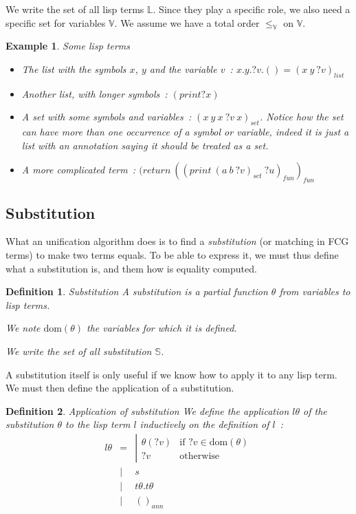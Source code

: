 \documentclass[]{article}
\newcommand{\1}{\mathbbm{1}}
\newcommand{\0}{\mathbbm{0}}
\newtheorem{defi}{Definition}
\newtheorem{ex}{Example}
\newcommand{\dom}{\text{dom}}
\begin{document}
We write the set of all lisp terms $\mathbb{L}$. Since they play a specific
role, we also need a specific set for variables $\mathbb{V}$. We assume we have
a total order $\leq_\mathbb{V}$ on $\mathbb{V}$.

\begin{ex}{Some lisp terms}\begin{itemize}
    \item The list with the symbols $x$, $y$ and the variable $v$~:
        $x.y.?v.() = (x\ y\ ?v)_{list}$
    \item Another list, with longer symbols~: $(print ?x)$
    \item A set with some symbols and variables~: $(x\ y\ x\ ?v\ x)_{set}$. Notice
        how the set can have more than one occurrence of a symbol or variable, indeed
        it is just a list with an annotation saying it should be treated as a set.
    \item A more complicated term~: $(return\ ((print\ (a\ b\ ?v)_{set}\ ?u)_{fun})_{fun}$
\end{itemize}\end{ex}

\subsection{Substitution}

What an unification algorithm does is to find a \emph{substitution} (or matching in
FCG terms) to make two terms equals. To be able to express it, we must thus define
what a substitution is, and them how is equality computed.

\begin{defi}{Substitution}
    A substitution is a partial function $\theta$ from variables to lisp terms.

    We note $\text{dom}(\theta)$ the variables for which it is defined.

    We write the set of all substitution $\mathbb{S}$.
\end{defi}

A substitution itself is only useful if we know how to apply it to any lisp
term. We must then define the application of a substitution.

\begin{defi}{Application of substitution}
    We define the application $l\theta$ of the substitution $\theta$ to the
    lisp term $l$ inductively on the definition of $l$~:
    \[\begin{array}{rcl}
        l\theta & = & \left|\begin{array}{ll}
                          \theta(?v) & \text{if } ?v\in\dom(\theta) \\
                          ?v         & \text{otherwise}
                      \end{array}\right. \\
                & | & s \\
                & | & t\theta.t\theta \\
                & | & ()_{ann} \\
    \end{array}\]
\end{defi}
\end{document}
